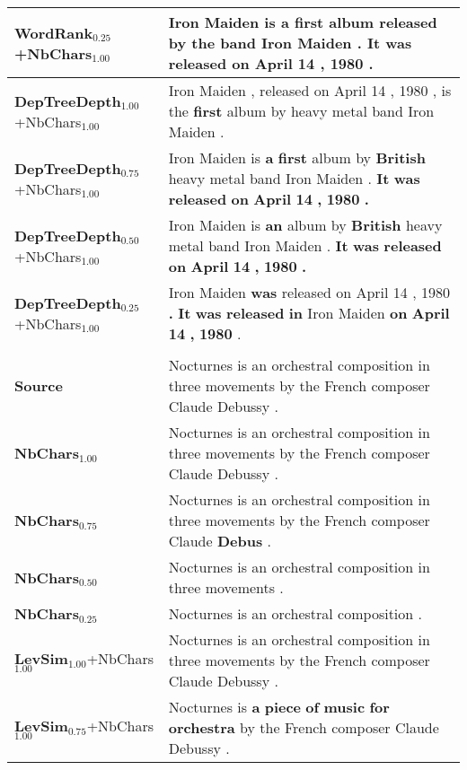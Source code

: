 \documentclass[10pt, a4paper]{article}
\begin{document}
\begin{table*}
{\begin{tabular}{ll}
\textbf{WordRank$_{0.25}$}\footnotesize{+NbChars$_{1.00}$} & Iron Maiden \textbf{is} \textbf{a} \textbf{first} \textbf{album} released \textbf{by} \textbf{the} \textbf{band} \textbf{Iron} \textbf{Maiden} \textbf{.} \textbf{It} \textbf{was} \textbf{released} on April 14 , 1980 . \\
\midrule
\textbf{DepTreeDepth$_{1.00}$}\footnotesize{+NbChars$_{1.00}$} & Iron Maiden , released on April 14 , 1980 , is the \textbf{first} album by heavy metal band Iron Maiden . \\
\textbf{DepTreeDepth$_{0.75}$}\footnotesize{+NbChars$_{1.00}$} & Iron Maiden is \textbf{a} \textbf{first} album by \textbf{British} heavy metal band Iron Maiden . \textbf{It} \textbf{was} \textbf{released} \textbf{on} \textbf{April} \textbf{14} \textbf{,} \textbf{1980} \textbf{.} \\
\textbf{DepTreeDepth$_{0.50}$}\footnotesize{+NbChars$_{1.00}$} & Iron Maiden is \textbf{an} album by \textbf{British} heavy metal band Iron Maiden . \textbf{It} \textbf{was} \textbf{released} \textbf{on} \textbf{April} \textbf{14} \textbf{,} \textbf{1980} \textbf{.} \\
\textbf{DepTreeDepth$_{0.25}$}\footnotesize{+NbChars$_{1.00}$} & Iron Maiden \textbf{was} released on April 14 , 1980 \textbf{.} \textbf{It} \textbf{was} \textbf{released} \textbf{in} Iron Maiden \textbf{on} \textbf{April} \textbf{14} \textbf{,} \textbf{1980} . \\
\midrule
& \\ \midrule
\textbf{Source} & Nocturnes is an orchestral composition in three movements by the French composer Claude Debussy . \\
\midrule
\textbf{NbChars$_{1.00}$} & Nocturnes is an orchestral composition in three movements by the French composer Claude Debussy . \\
\textbf{NbChars$_{0.75}$} & Nocturnes is an orchestral composition in three movements by the French composer Claude \textbf{Debus} . \\
\textbf{NbChars$_{0.50}$} & Nocturnes is an orchestral composition in three movements . \\
\textbf{NbChars$_{0.25}$} & Nocturnes is an orchestral composition . \\
\midrule
\textbf{LevSim$_{1.00}$}\footnotesize{+NbChars$_{1.00}$} & Nocturnes is an orchestral composition in three movements by the French composer Claude Debussy . \\
\textbf{LevSim$_{0.75}$}\footnotesize{+NbChars$_{1.00}$} & Nocturnes is \textbf{a} \textbf{piece} \textbf{of} \textbf{music} \textbf{for} \textbf{orchestra} by the French composer Claude Debussy . \\

\end{tabular}}
\end{table*}
\end{document}
